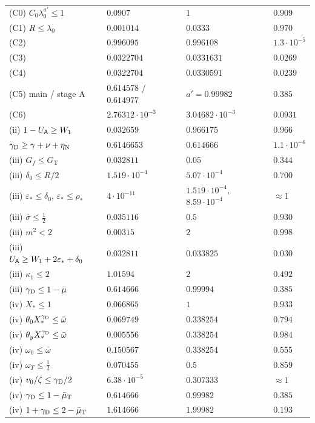 \begin{table}[p]
\begin{tabular}{@{}llll@{}}
(C0) $C_0\lambda_0^{a'}\le1$ & $0.0907$ & $1$ & $0.909$\\
(C1) $R\le\lambda_0$ & $0.001014$ & $0.0333$ & $0.970$\\
(C2) & $0.996095$ & $0.996108$ & $1.3\cdot10^{-5}$\\
(C3) & $0.0322704$ & $0.0331631$ & $0.0269$\\
(C4) & $0.0322704$ & $0.0330591$ & $0.0239$\\
(C5) main / stage A & $0.614578$ / $0.614977$ & $a'=0.99982$ & $0.385$\\
(C6) & $2.76312\cdot10^{-3}$ & $3.04682\cdot10^{-3}$ & $0.0931$\\
\midrule
(ii) $1-U_{\mathsf A}\ge W_1$ & $0.032659$ & $0.966175$ & $0.966$\\
$\gamma_{\mathrm D}\ge\gamma+\nu+\eta_{\mathrm N}$ & $0.6146653$ & $0.614666$ & $1.1\cdot10^{-6}$\\
(iii) $G_f\le G_{\mathrm T}$ & $0.032811$ & $0.05$ & $0.344$\\
(iii) $\delta_0\le R/2$ & $1.519\cdot10^{-4}$ & $5.07\cdot10^{-4}$ & $0.700$\\
(iii) $\varepsilon_*\le\delta_0$, $\varepsilon_*\le\rho_*$ & $4\cdot10^{-11}$ & $1.519\cdot10^{-4}$, $8.59\cdot10^{-4}$ & $\approx1$\\
(iii) $\bar\sigma\le\frac12$ & $0.035116$ & $0.5$ & $0.930$\\
(iii) $m^2<2$ & $0.00315$ & $2$ & $0.998$\\
(iii) $U_{\mathsf A}\ge W_1+2\varepsilon_*+\delta_0$ & $0.032811$ & $0.033825$ & $0.030$\\
(iii) $\kappa_1\le2$ & $1.01594$ & $2$ & $0.492$\\
(iii) $\gamma_{\mathrm D}\le1-\bar\mu$ & $0.614666$ & $0.99994$ & $0.385$\\
(iv) $X_*\le1$ & $0.066865$ & $1$ & $0.933$\\
(iv) $\theta_0X_*^{\gamma_{\mathrm D}}\le\bar\omega$ & $0.069749$ & $0.338254$ & $0.794$\\
(iv) $\theta_yX_*^{\gamma_{\mathrm D}}\le\bar\omega$ & $0.005556$ & $0.338254$ & $0.984$\\
(iv) $\omega_0\le\bar\omega$ & $0.150567$ & $0.338254$ & $0.555$\\
(iv) $\omega_T\le\frac12$ & $0.070455$ & $0.5$ & $0.859$\\
(iv) $v_0/\zeta\le\gamma_{\mathrm D}/2$ & $6.38\cdot10^{-5}$ & $0.307333$ & $\approx1$\\
(iv) $\gamma_{\mathrm D}\le1-\bar\mu_{\mathrm T}$ & $0.614666$ & $0.99982$ & $0.385$\\
(iv) $1+\gamma_{\mathrm D}\le2-\bar\mu_{\mathrm T}$ & $1.614666$ & $1.99982$ & $0.193$\\

\end{tabular}
\end{table}
